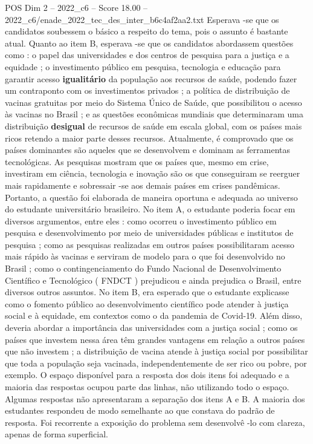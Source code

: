 \begin{textsample}{POS Dim 2 – 2022\_c6 – Score 18.00 – 2022\_c6/enade\_2022\_tec\_des\_inter\_b6c4af2aa2.txt}
Esperava -se que os candidatos soubessem o básico a respeito do tema, pois o assunto é bastante atual.
Quanto ao item B, esperava -se que os candidatos abordassem questões como : o papel das universidades e dos centros de pesquisa para a justiça e a equidade ; o investimento público em pesquisa, tecnologia e educação para garantir acesso \textbf{igualitário} da população aos recursos de saúde, podendo fazer um contraponto com os investimentos privados ; a política de distribuição de vacinas gratuitas por meio do Sistema Único de Saúde, que possibilitou o acesso às vacinas no Brasil ; e as questões econômicas mundiais que determinaram uma distribuição \textbf{desigual} de recursos de saúde em escala global, com os países mais ricos retendo a maior parte desses recursos.
Atualmente, é comprovado que os países dominantes são aqueles que se desenvolvem e dominam as ferramentas tecnológicas.
As pesquisas mostram que os países que, mesmo em crise, investiram em ciência, tecnologia e inovação são os que conseguiram se reerguer mais rapidamente e sobressair -se aos demais países em crises pandêmicas.
Portanto, a questão foi elaborada de maneira oportuna e adequada ao universo do estudante universitário brasileiro.
No item A, o estudante poderia focar em diversos argumentos, entre eles : como ocorreu o investimento público em pesquisa e desenvolvimento por meio de universidades públicas e institutos de pesquisa ; como as pesquisas realizadas em outros países possibilitaram acesso mais rápido às vacinas e serviram de modelo para o que foi desenvolvido no Brasil ; como o contingenciamento do Fundo Nacional de Desenvolvimento Científico e Tecnológico ( FNDCT ) prejudicou e ainda prejudica o Brasil, entre diversos outros assuntos.
No item B, era esperado que o estudante explicasse como o fomento público ao desenvolvimento científico pode atender à justiça social e à equidade, em contextos como o da pandemia de Covid-19.
Além disso, deveria abordar a importância das universidades com a justiça social ; como os países que investem nessa área têm grandes vantagens em relação a outros países que não investem ; a distribuição de vacina atende à justiça social por possibilitar que toda a população seja vacinada, independentemente de ser rico ou pobre, por exemplo.
O espaço disponível para a resposta dos dois itens foi adequado e a maioria das respostas ocupou parte das linhas, não utilizando todo o espaço.
Algumas respostas não apresentaram a separação dos itens A e B.
A maioria dos estudantes respondeu de modo semelhante ao que constava do padrão de resposta.
Foi recorrente a exposição do problema sem desenvolvê -lo com clareza, apenas de forma superficial.

\end{textsample}
